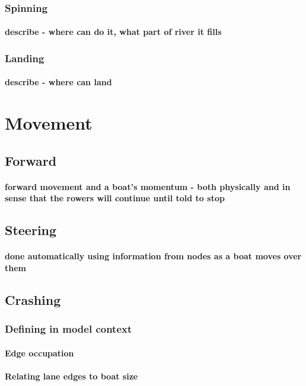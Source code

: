      \subsubsection{Spinning}
        \paragraph{describe - where can do it, what part of river it fills}
      \subsubsection{Landing}
        \paragraph{describe - where can land}
    
  \section{Movement}
    \subsection{Forward}
      \paragraph{forward movement and a boat's momentum - both physically and in sense that the rowers will continue until told to stop}
    \subsection{Steering}
      \paragraph{done automatically using information from nodes as a boat moves over them}
    \subsection{Crashing}
      \subsubsection{Defining in model context}
        \paragraph{Edge occupation}
        \paragraph{Relating lane edges to boat size}
